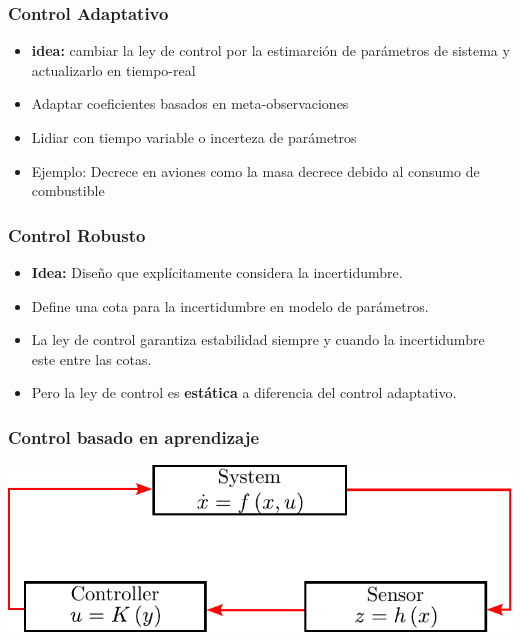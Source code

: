\begin{frame}
    \frametitle{Control Adaptativo}
    
    \begin{itemize}
        \item \textbf{idea:} cambiar la ley de control por la estimarción de parámetros de sistema y actualizarlo en tiempo-real
        \item Adaptar coeficientes basados en meta-observaciones
        \item Lidiar con tiempo variable o incerteza de parámetros
        \item Ejemplo: Decrece en aviones como la masa decrece debido al consumo de combustible 
    \end{itemize}
    
\end{frame}

\begin{frame}
    \frametitle{Control Robusto}
    
    \begin{itemize}
        \item \textbf{Idea:} Diseño que explícitamente considera la incertidumbre.
        \item Define una cota para la incertidumbre en modelo de parámetros.
        \item La ley de control garantiza estabilidad siempre y cuando la incertidumbre este entre las cotas.
        \item Pero la ley de control es \textbf{estática} a diferencia del control adaptativo.
    \end{itemize}
    
\end{frame}

\begin{frame}
    \frametitle{Control basado en aprendizaje}
    
    \begin{center}
        \includegraphics[width=0.7\columnwidth]{./images/learning_based_control.pdf}
    \end{center}
    
\end{frame}

